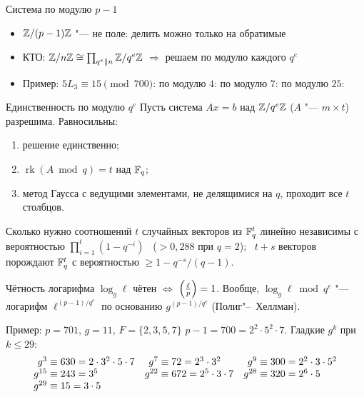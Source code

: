 \documentclass{ca-slides}
\begin{document}
\begin{canvasframe}{Система по модулю $p - 1$}
  \begin{itemize}
    \item $\mathbb{Z}/(p-1)\mathbb{Z}$ "--- не поле: делить можно только на обратимые
    \item КТО: $\mathbb{Z}/n\mathbb{Z} \cong \prod_{q^e \parallel n} \mathbb{Z}/q^e\mathbb{Z}$ $\Rightarrow$ решаем по модулю
      каждого $q^e$
    \item Пример: $5 L_3 \equiv 15 \pmod{700}$:
      \quad по модулю $4$: \hspace{6em} по модулю $7$: \hspace{6em} по модулю $25$:
  \end{itemize}
  \notearea[0.18\textheight]
\end{canvasframe}

\begin{theoremframe}{Единственность по модулю $q^e$}
  Пусть система $Ax = b$ над $\mathbb{Z}/q^e\mathbb{Z}$ ($A$ "--- $m \times t$) разрешима. Равносильны:
  \begin{enumerate}
    \item решение единственно;
    \item $\operatorname{rk}(A \bmod q) = t$ над $\mathbb{F}_q$;
    \item метод Гаусса с ведущими элементами, не делящимися на $q$, проходит все $t$ столбцов.
  \end{enumerate}
\end{theoremframe}

\begin{theoremframe}[proposition]{Сколько нужно соотношений}
  $t$ случайных векторов из $\mathbb{F}_q^t$ линейно независимы с вероятностью
  $\prod_{i=1}^t (1 - q^{-i})$ \ ($> 0{,}288$ при $q = 2$); \
  $t + s$ векторов порождают $\mathbb{F}_q^t$ с вероятностью $\ge 1 - q^{-s}/(q - 1)$.
\end{theoremframe}

\begin{theoremframe}[proposition]{Чётность логарифма}
  $\log_g \ell$ чётен $\iff$ $\left(\frac{\ell}{p}\right) = 1$.
  Вообще, $\log_g \ell \bmod q^e$ "--- логарифм $\ell^{(p-1)/q^e}$ по основанию
  $g^{(p-1)/q^e}$ (Полиг"--~Хеллман).
\end{theoremframe}

\begin{canvasframe}{Пример: $p = 701$, $g = 11$, $F = \{2, 3, 5, 7\}$}
  \small
  $p - 1 = 700 = 2^2 \cdot 5^2 \cdot 7$. Гладкие $g^k$ при $k \le 29$:
  \[
  \begin{array}{r@{\;\equiv\;}l@{\quad}r@{\;\equiv\;}l@{\quad}r@{\;\equiv\;}l}
    g^{3} & 630 = 2 \cdot 3^2 \cdot 5 \cdot 7 & g^{7} & 72 = 2^3 \cdot 3^2 & g^{9} & 300 = 2^2 \cdot 3 \cdot 5^2 \\
    g^{15} & 243 = 3^5 & g^{22} & 672 = 2^5 \cdot 3 \cdot 7 & g^{28} & 320 = 2^6 \cdot 5 \\
    g^{29} & 15 = 3 \cdot 5
  \end{array}
  \]
  \notearea[0.36\textheight]
\end{canvasframe}
\end{document}
